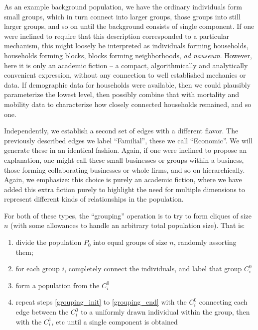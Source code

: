 \documentclass{article}
\begin{document}
As an example background population, we have the ordinary individuals form small groups, which in turn connect into larger groups, those groups into still larger groups, and so on until the background consists of single component.  If one were inclined to require that this description corresponded to a particular mechanism, this might loosely be interpreted as individuals forming households, households forming blocks, blocks forming neighborhoods, {\em ad nauseum}.  However, here it is only an academic fiction -- a compact, algorithmically and analytically convenient expression, without any connection to well established mechanics or data.  If demographic data for households were available, then we could plausibly parameterize the lowest level, then possibly combine that with mortality and mobility data to characterize how closely connected households remained, and so one.

Independently, we establish a second set of edges with a different flavor.  The previously described edges we label ``Familial'', these we call ``Economic''.  We will generate these in an identical fashion.  Again, if one were inclined to propose an explanation, one might call these small businesses or groups within a business, those forming collaborating businesses or whole firms, and so on hierarchically.  Again, we emphasize: this choice is purely an academic fiction, where we have added this extra fiction purely to highlight the need for multiple dimensions to represent different kinds of relationships in the population.

For both of these types, the ``grouping'' operation is to try to form cliques of size $n$ (with some allowances to handle an arbitrary total population size).  That is:\begin{enumerate}
\item\label{grouping_init} divide the population $P_0$ into equal groups of size $n$, randomly assorting them;
\item for each group $i$, completely connect the individuals, and label that group $C_i^0$
\item\label{grouping_end} form a population from the $C_i^0$
\item repeat steps \ref{grouping_init} to \ref{grouping_end} with the $C_i^0$ connecting each edge between the $C_i^0$ to a uniformly drawn individual within the group, then with the $C_i^1$, etc until a single component is obtained
\end{enumerate}
\end{document}
